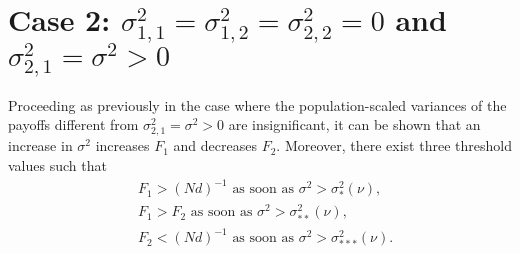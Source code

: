 \documentclass[11pt]{article}
\begin{document}

\section{Case 2: $\sigma^2_{1,1}=\sigma^2_{1,2}=\sigma^2_{2,2}=0$ and $\sigma^2_{2,1}=\sigma^2>0$}

Proceeding as previously in the case where the population-scaled variances of the payoffs different from $\sigma^2_{2,1}=\sigma^2>0$ are insignificant, it can be shown that an increase in $\sigma^2$ increases $F_1$ and decreases $F_2$. Moreover, there exist three threshold values such that
%
\begin{subequations}\label{sec5-case2-eq3}
\begin{align}
&F_1>(Nd)^{-1}\mbox{   as soon as  }\sigma^2> \sigma^2_{*}(\nu),\\
&F_1>F_2\mbox{  as soon as  }\sigma^2> \sigma^2_{**}(\nu),\\
&F_2<(Nd)^{-1}\mbox{   as soon as  }\sigma^2> \sigma^2_{***}(\nu).
\end{align}
\end{subequations} 
\end{document}
